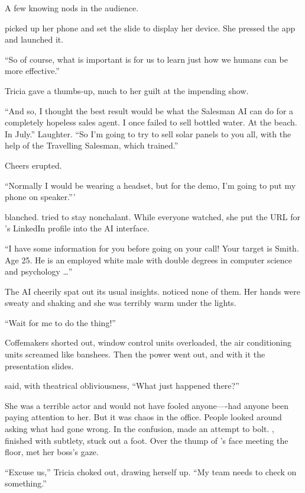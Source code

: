 {A few knowing nods in the audience.

{\protag} picked up her phone and set the slide to display her device. She pressed the app and launched it.

``So of course, what is important is for us to learn just how we humans can be more effective.''

Tricia gave {\protag} a thumbs-up, much to her guilt at the impending show.

``And so, I thought the best result would be what the Salesman AI can do for a completely hopeless sales agent. I once failed to sell bottled water. At the beach. In July.'' Laughter. ``So I'm going to try to sell solar panels to you all, with the help of the Travelling Salesman, which {\energyJerk} trained.''

Cheers erupted.

``Normally I would be wearing a headset, but for the demo, I'm going to put my phone on speaker.'''

{\energyJerk} blanched. {\protag} tried to stay nonchalant. While everyone watched, she put the URL for {\energyJerk}'s LinkedIn profile into the AI interface.

``I have some information for you before going on your call! Your target is {\energyJerk} Smith. Age 25. He is an employed white male with double degrees in computer science and psychology \dots''

The AI cheerily spat out its usual insights. {\protag} noticed none of them. Her hands were sweaty and shaking and she was terribly warm under the lights.

``Wait for me to do the thing!''

Coffemakers shorted out, window control units overloaded, the air conditioning units screamed like banshees. Then the power went out, and with it the presentation slides.

{\protag} said, with theatrical obliviousness, ``What just happened there?''

She was a terrible actor and would not have fooled anyone----had anyone been paying attention to her. But it was chaos in the office. People looked around asking what had gone wrong. In the confusion, {\energyJerk} made an attempt to bolt. {\protag}, finished with subtlety, stuck out a foot. Over the thump of {\energyJerk}'s face meeting the floor, {\protag} met her boss's gaze.

``Excuse us,'' Tricia choked out, drawing herself up. ``My team needs to check on something.''

}
